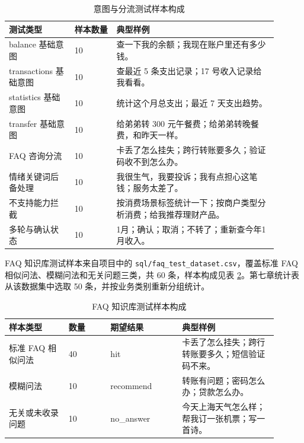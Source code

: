 \documentclass[bachelor, print]{xduthesis}
\begin{document}
\begin{appendix}
\begin{table}[H]
    \centering
    \caption{意图与分流测试样本构成}
    \label{tab:intent-sample-appendix}
    \small
    \setlength{\tabcolsep}{4pt}
    \begin{tabular}{|p{0.22\linewidth}|p{0.14\linewidth}|p{0.54\linewidth}|}
        \hline
        测试类型 & 样本数量 & 典型样例 \\
        \hline
        balance 基础意图 & 10 & 查一下我的余额；我现在账户里还有多少钱。 \\
        \hline
        transactions 基础意图 & 10 & 查最近 5 条支出记录；17 号收入记录给我看看。 \\
        \hline
        statistics 基础意图 & 10 & 统计这个月总支出；最近 7 天支出趋势。 \\
        \hline
        transfer 基础意图 & 10 & 给弟弟转 300 元午餐费；给弟弟转晚餐费，和昨天一样。 \\
        \hline
        FAQ 咨询分流 & 10 & 卡丢了怎么挂失；跨行转账要多久；验证码收不到怎么办。 \\
        \hline
        情绪关键词后备处理 & 10 & 我很生气，我要投诉；我有点担心这笔钱；服务太差了。 \\
        \hline
        不支持能力拦截 & 10 & 按消费场景标签统计一下；按商户类型分析消费；给我推荐理财产品。 \\
        \hline
        多轮与确认状态 & 10 & 1月；确认；取消；不转了；重新查今年1月收入。 \\
        \hline
    \end{tabular}
\end{table}

FAQ 知识库测试样本来自项目中的 \texttt{sql/faq\_test\_dataset.csv}，覆盖标准 FAQ 相似问法、模糊问法和无关问题三类，共 60 条，样本构成见表 \ref{tab:faq-sample-appendix}。第七章统计表从该数据集中选取 50 条，并按业务类别重新分组统计。

\begin{table}[H]
    \centering
    \caption{FAQ 知识库测试样本构成}
    \label{tab:faq-sample-appendix}
    \small
    \setlength{\tabcolsep}{4pt}
    \begin{tabular}{|p{0.2\linewidth}|p{0.14\linewidth}|p{0.24\linewidth}|p{0.32\linewidth}|}
        \hline
        样本类型 & 数量 & 期望结果 & 典型样例 \\
        \hline
        标准 FAQ 相似问法 & 40 & hit & 卡丢了怎么挂失；跨行转账要多久；短信验证码不来。 \\
        \hline
        模糊问法 & 10 & recommend & 转账有问题；密码怎么办；贷款怎么办。 \\
        \hline
        无关或未收录问题 & 10 & no\_answer & 今天上海天气怎么样；帮我订一张机票；写一首诗。 \\
        \hline
    \end{tabular}
\end{table}


\end{appendix}
\end{document}
